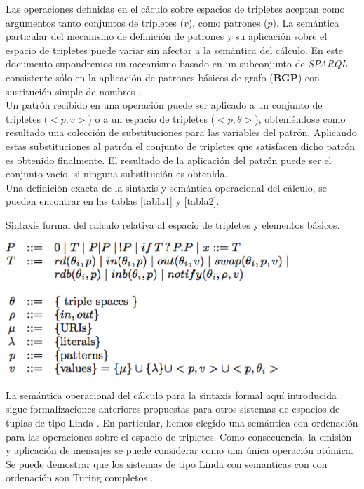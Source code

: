 Las operaciones definidas en el c\'aculo sobre espacios de tripletes aceptan como argumentos tanto conjuntos de tripletes ($v$), como patrones ($p$). La sem\'antica particular del mecanismo de definici\'on de patrones y su aplicaci\'on sobre el espacio de tripletes puede variar sin afectar a la sem\'antica del c\'alculo. En este documento supondremos un mecanismo basado en un subconjunto de \textit{SPARQL} consistente s\'olo en la aplicaci\'on de patrones b\'asicos de grafo (\textbf{BGP}) con sustituci\'on simple de nombres \cite{sparql}.\\
Un patr\'on recibido en una operaci\'on puede ser aplicado a un conjunto de tripletes $(< p,v >$) o a un espacio de tripletes ($< p,\theta >$), obteni\'endose como resultado una colecci\'on de substituciones para las variables del patr\'on. Aplicando estas substituciones al patr\'on el conjunto de tripletes que satisfacen dicho patr\'on es obtenido finalmente. El resultado de la aplicaci\'on del patr\'on puede ser el conjunto vac\'io, si ninguna substituci\'on es obtenida.\\
Una definici\'on exacta de la sintaxis y sem\'antica operacional del c\'alculo, se pueden encontrar en las tablas \ref{tabla1} y \ref{tabla2}.\\

\begin{table}
\vspace{2.4in}
\caption{Sintaxis formal del calculo relativa al espacio de tripletes y elementos b\'asicos.}
\vspace{5mm}
\includegraphics[width=0.8\textwidth]{tabla1}
\label{tabla1}
\end{table}

La sem\'antica operacional del c\'alculo para la sintaxis formal aqu\'i introducida sigue formalizaciones anteriores propuestas para otros sistemas de espacios de tuplas de tipo Linda \cite{linda}. En particular, hemos elegido una sem\'antica con ordenaci\'on para las operaciones sobre el espacio de tripletes. Como consecuencia, la emisi\'on y aplicaci\'on de mensajes se puede considerar como una \'unica operaci\'on at\'omica. Se puede demostrar que los sistemas de tipo Linda con semanticas con con ordenaci\'on son Turing completos \cite{busi2000expressiveness}.\\

